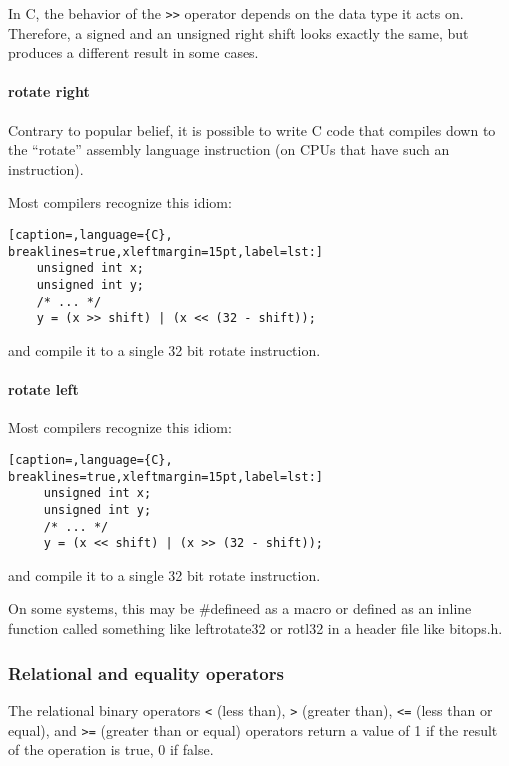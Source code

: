 In C, the behavior of the \texttt{\textgreater{}\textgreater{}} operator
depends on the data type it acts on.  Therefore, a signed and an unsigned right
shift looks exactly the same, but produces a different result in some cases.

\paragraph{rotate right}
Contrary to popular belief, it is possible to write C code that compiles down
to the ``rotate'' assembly language instruction (on CPUs that have such an
instruction).

Most compilers recognize this idiom:

\lstset{basicstyle=\scriptsize, numbers=left, captionpos=b, tabsize=4}
\begin{lstlisting}[caption=,language={C},
breaklines=true,xleftmargin=15pt,label=lst:]
	unsigned int x;
	unsigned int y;
	/* ... */
	y = (x >> shift) | (x << (32 - shift));
\end{lstlisting}

and compile it to a single 32 bit rotate instruction.

\paragraph{rotate left}
Most compilers recognize this idiom:

\lstset{basicstyle=\scriptsize, numbers=left, captionpos=b, tabsize=4}
\begin{lstlisting}[caption=,language={C},
breaklines=true,xleftmargin=15pt,label=lst:]
	 unsigned int x;
	 unsigned int y;
	 /* ... */
	 y = (x << shift) | (x >> (32 - shift));
\end{lstlisting}

and compile it to a single 32 bit rotate instruction.

On some systems, this may be \#defineed as a macro or defined as an inline
function called something like leftrotate32 or rotl32 in a header file
like bitops.h.

\subsubsection{Relational and equality operators}
The relational binary operators \texttt{\textless{}} (less than),
\texttt{\textgreater{}} (greater than), \texttt{\textless{}=} (less than or
equal), and \texttt{\textgreater{}=} (greater than or equal) operators return a
value of 1 if the result of the operation is true, 0 if false.

